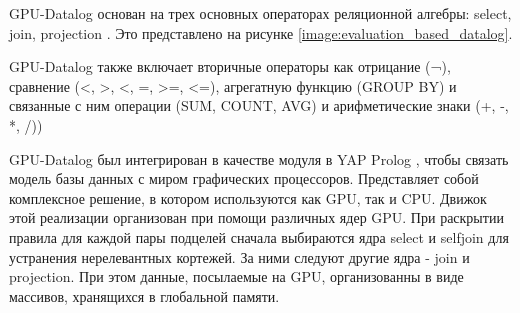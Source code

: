 GPU-Datalog основан на трех основных операторах реляционной алгебры: select, join, projection \cite{gpu_datalog}. Это представлено на рисунке \ref{image:evaluation_based_datalog}.

\begin{figure}[H]
\end{figure} 

GPU-Datalog также включает вторичные операторы как отрицание (¬), сравнение (<, >, <, =, >=, <=), агрегатную функцию (GROUP BY) и связанные с ним операции (SUM, COUNT, AVG) и арифметические знаки \newline (+, -, *, /))

GPU-Datalog был интегрирован в качестве модуля в YAP Prolog \cite{yap_prolog}, чтобы связать модель базы данных с миром графических процессоров. Представляет собой комплексное решение, в котором используются как GPU, так и CPU. Движок этой реализации организован при помощи различных ядер GPU. При раскрытии правила для каждой пары подцелей сначала выбираются ядра select и selfjoin для устранения нерелевантных кортежей. За ними следуют другие ядра - join и projection. При этом данные, посылаемые на GPU, организованны в виде массивов, хранящихся в глобальной памяти.

